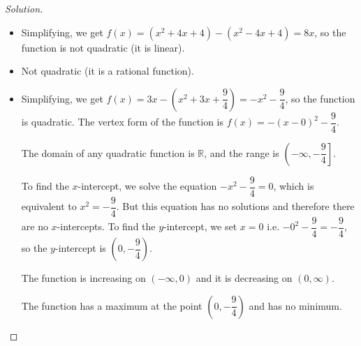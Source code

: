 \documentclass[12pt]{article}
\newenvironment{solution}{\begin{proof}[Solution]}{\end{proof}}
\begin{document}
\begin{enumerate}
\begin{solution}
\begin{itemize}
				\item[(b)] 	Simplifying, we get $f(x)=(x^2+4x+4)-(x^2-4x+4)=8x$, so the function is not quadratic (it is linear).
				\item[(c)] 	Not quadratic (it is a rational function).
				\item[(d)] 
				Simplifying, we get $f(x)=3x-(x^2+3x+\dfrac{9}{4})=-x^2-\dfrac{9}{4}$, so the function is quadratic. The vertex form of the function is $f(x)=-(x-0)^2-\dfrac{9}{4}$.
				
				The domain of any quadratic function is $\mathbb{R}$, and the range is $\left( -\infty, -\dfrac{9}{4}\right]$.
				
				To find the $x$-intercept, we solve the equation $-x^2-\dfrac{9}{4}=0$, which is equivalent to $x^2=-\dfrac{9}{4}$. But this equation has no solutions and therefore there are no $x$-intercepts. To find the $y$-intercept, we set $x=0$ i.e. $-0^2-\dfrac{9}{4}=-\dfrac{9}{4}$, so the $y$-intercept is $(0,-\dfrac{9}{4})$.
				
				The function is increasing on $(-\infty,0)$ and it is decreasing on $(0,\infty)$.
				
				The function has a maximum at the point $\left(0,-\dfrac{9}{4}\right)$ and has no minimum.
				
\end{itemize}
\end{solution}
\end{enumerate}
\end{document}
